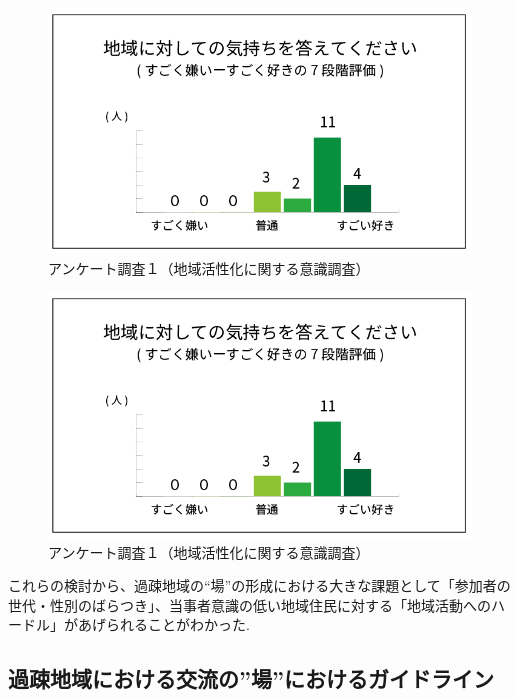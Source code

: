 \documentclass[a4paper]{jsarticle}
\begin{document}
\begin{figure}[h]
  \begin{center}
    \includegraphics[width=0.95\hsize]{./images/03}
    \caption{アンケート調査１（地域活性化に関する意識調査）}
    \label{fig:tmu_hino}
  \end{center}
\end{figure}
\begin{figure}[h]
  \begin{center}
    \includegraphics[width=0.95\hsize]{./images/03}
    \caption{アンケート調査１（地域活性化に関する意識調査）}
    \label{fig:tmu_hino}
  \end{center}
\end{figure}


これらの検討から、過疎地域の“場”の形成における大きな課題として「参加者の世代・性別のばらつき」、当事者意識の低い地域住民に対する「地域活動へのハードル」があげられることがわかった.



\subsection{過疎地域における交流の”場”におけるガイドライン}
\end{document}
